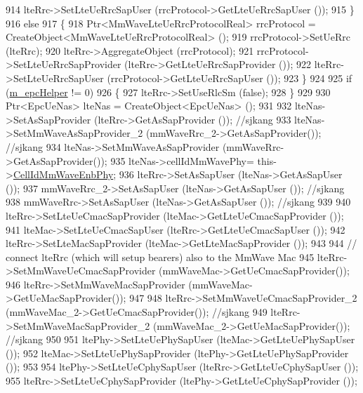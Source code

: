 \begin{DoxyCode}
914                 lteRrc->SetLteUeRrcSapUser (rrcProtocol->GetLteUeRrcSapUser ());
915         \}
916         \textcolor{keywordflow}{else}
917         \{
918                 Ptr<MmWaveLteUeRrcProtocolReal> rrcProtocol = CreateObject<MmWaveLteUeRrcProtocolReal> ();
919                 rrcProtocol->SetUeRrc (lteRrc);
920                 lteRrc->AggregateObject (rrcProtocol);
921                 rrcProtocol->SetLteUeRrcSapProvider (lteRrc->GetLteUeRrcSapProvider ());
922                 lteRrc->SetLteUeRrcSapUser (rrcProtocol->GetLteUeRrcSapUser ());
923         \}
924 
925         \textcolor{keywordflow}{if} (\hyperlink{classns3_1_1MmWaveHelper_a03b33f9a2480a4cdd8ffe697ccc08e9e}{m\_epcHelper} != 0)
926         \{
927                 lteRrc->SetUseRlcSm (\textcolor{keyword}{false});
928         \}
929 
930         Ptr<EpcUeNas> lteNas = CreateObject<EpcUeNas> ();
931 
932         lteNas->SetAsSapProvider (lteRrc->GetAsSapProvider ()); \textcolor{comment}{//sjkang}
933         lteNas->SetMmWaveAsSapProvider\_2 (mmWaveRrc\_2->GetAsSapProvider()); \textcolor{comment}{//sjkang}
934         lteNas->SetMmWaveAsSapProvider (mmWaveRrc->GetAsSapProvider());
935     lteNas->cellIdMmWavePhy= this->\hyperlink{classns3_1_1MmWaveHelper_af1bd1010ff8be40be5e86c076acf116d}{CellIdMmWaveEnbPhy};
936         lteRrc->SetAsSapUser (lteNas->GetAsSapUser ());
937         mmWaveRrc\_2->SetAsSapUser (lteNas->GetAsSapUser ()); \textcolor{comment}{//sjkang}
938         mmWaveRrc->SetAsSapUser (lteNas->GetAsSapUser ()); \textcolor{comment}{//sjkang}
939 
940         lteRrc->SetLteUeCmacSapProvider (lteMac->GetLteUeCmacSapProvider ());
941         lteMac->SetLteUeCmacSapUser (lteRrc->GetLteUeCmacSapUser ());
942         lteRrc->SetLteMacSapProvider (lteMac->GetLteMacSapProvider ());
943 
944         \textcolor{comment}{// connect lteRrc (which will setup bearers) also to the MmWave Mac}
945         lteRrc->SetMmWaveUeCmacSapProvider (mmWaveMac->GetUeCmacSapProvider());
946         lteRrc->SetMmWaveMacSapProvider (mmWaveMac->GetUeMacSapProvider()); 
947 
948         lteRrc->SetMmWaveUeCmacSapProvider\_2 (mmWaveMac\_2->GetUeCmacSapProvider()); \textcolor{comment}{//sjkang}
949         lteRrc->SetMmWaveMacSapProvider\_2 (mmWaveMac\_2->GetUeMacSapProvider());  \textcolor{comment}{//sjkang}
950 
951         ltePhy->SetLteUePhySapUser (lteMac->GetLteUePhySapUser ());
952         lteMac->SetLteUePhySapProvider (ltePhy->GetLteUePhySapProvider ());
953 
954         ltePhy->SetLteUeCphySapUser (lteRrc->GetLteUeCphySapUser ());
955         lteRrc->SetLteUeCphySapProvider (ltePhy->GetLteUeCphySapProvider ());

\end{DoxyCode}
